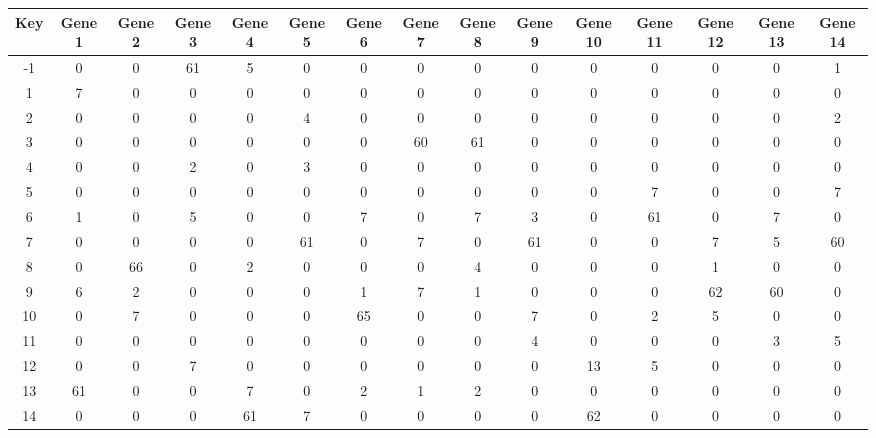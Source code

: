\begin{tabular}{|c|c|c|c|c|c|c|c|c|c|c|c|c|c|c|}
\hline
Key & Gene 1 & Gene 2 & Gene 3 & Gene 4 & Gene 5 & Gene 6 & Gene 7 & Gene 8 & Gene 9 & Gene 10 & Gene 11 & Gene 12 & Gene 13 & Gene 14 \\
\hline
-1 & 0 & 0 & 61 & 5 & 0 & 0 & 0 & 0 & 0 & 0 & 0 & 0 & 0 & 1 \\
1 & 7 & 0 & 0 & 0 & 0 & 0 & 0 & 0 & 0 & 0 & 0 & 0 & 0 & 0 \\
2 & 0 & 0 & 0 & 0 & 4 & 0 & 0 & 0 & 0 & 0 & 0 & 0 & 0 & 2 \\
3 & 0 & 0 & 0 & 0 & 0 & 0 & 60 & 61 & 0 & 0 & 0 & 0 & 0 & 0 \\
4 & 0 & 0 & 2 & 0 & 3 & 0 & 0 & 0 & 0 & 0 & 0 & 0 & 0 & 0 \\
5 & 0 & 0 & 0 & 0 & 0 & 0 & 0 & 0 & 0 & 0 & 7 & 0 & 0 & 7 \\
6 & 1 & 0 & 5 & 0 & 0 & 7 & 0 & 7 & 3 & 0 & 61 & 0 & 7 & 0 \\
7 & 0 & 0 & 0 & 0 & 61 & 0 & 7 & 0 & 61 & 0 & 0 & 7 & 5 & 60 \\
8 & 0 & 66 & 0 & 2 & 0 & 0 & 0 & 4 & 0 & 0 & 0 & 1 & 0 & 0 \\
9 & 6 & 2 & 0 & 0 & 0 & 1 & 7 & 1 & 0 & 0 & 0 & 62 & 60 & 0 \\
10 & 0 & 7 & 0 & 0 & 0 & 65 & 0 & 0 & 7 & 0 & 2 & 5 & 0 & 0 \\
11 & 0 & 0 & 0 & 0 & 0 & 0 & 0 & 0 & 4 & 0 & 0 & 0 & 3 & 5 \\
12 & 0 & 0 & 7 & 0 & 0 & 0 & 0 & 0 & 0 & 13 & 5 & 0 & 0 & 0 \\
13 & 61 & 0 & 0 & 7 & 0 & 2 & 1 & 2 & 0 & 0 & 0 & 0 & 0 & 0 \\
14 & 0 & 0 & 0 & 61 & 7 & 0 & 0 & 0 & 0 & 62 & 0 & 0 & 0 & 0 \\
\hline
\end{tabular}